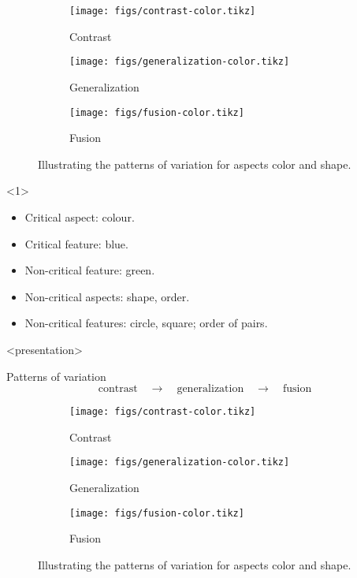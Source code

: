 \begin{frame}\label<1>{vtsummary}
  \begin{figure}
    \begin{subfigure}{0.3\columnwidth}
      \centering
      \texttt{[image: figs/contrast-color.tikz]}
      \caption{Contrast}
    \end{subfigure}
    \hfill
    \begin{subfigure}{0.3\columnwidth}
      \centering
      \texttt{[image: figs/generalization-color.tikz]}
      \caption{Generalization}
    \end{subfigure}
    \hfill
    \begin{subfigure}{0.3\columnwidth}
      \centering
      \texttt{[image: figs/fusion-color.tikz]}
      \caption{Fusion}
    \end{subfigure}
    \caption{%
      Illustrating the patterns of variation for aspects color and shape.
    }
  \end{figure}

  \begin{onlyenv}<1>
    \begin{example}
      \begin{itemize}
        \item Critical aspect: colour.
        \item Critical feature: blue.
        \item Non-critical feature: green.
        \item Non-critical aspects: shape, order.
        \item Non-critical features: circle, square; order of pairs.
      \end{itemize}
    \end{example}
  \end{onlyenv}
\end{frame}

\begin{frame}<presentation>
  \begin{block}{Patterns of variation}
    \vspace{-0.5em}
    \[
      \text{contrast}
      \quad\rightarrow\quad
      \text{generalization}
      \quad\rightarrow\quad
      \text{fusion}
    \]
  \end{block}

  \begin{figure}
    \begin{subfigure}{0.3\columnwidth}
      \centering
      \texttt{[image: figs/contrast-color.tikz]}
      \caption{Contrast}
    \end{subfigure}
    \hfill
    \begin{subfigure}{0.3\columnwidth}
      \centering
      \texttt{[image: figs/generalization-color.tikz]}
      \caption{Generalization}
    \end{subfigure}
    \hfill
    \begin{subfigure}{0.3\columnwidth}
      \centering
      \texttt{[image: figs/fusion-color.tikz]}
      \caption{Fusion}
    \end{subfigure}
    \caption{%
      Illustrating the patterns of variation for aspects color and shape.
    }
  \end{figure}
\end{frame}

